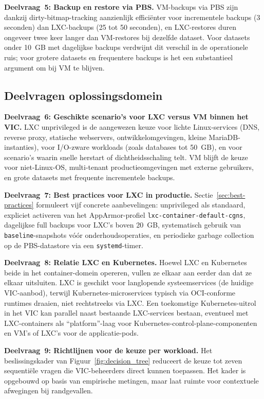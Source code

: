 \textbf{Deelvraag~5: Backup en restore via PBS.} VM-backups via PBS zijn dankzij dirty-bitmap-tracking aanzienlijk efficiënter voor incrementele backups (3 seconden) dan LXC-backups (25 tot 50 seconden), en LXC-restores duren ongeveer twee keer langer dan VM-restores bij dezelfde dataset. Voor datasets onder 10~GB met dagelijkse backups verdwijnt dit verschil in de operationele ruis; voor grotere datasets en frequentere backups is het een substantieel argument om bij VM te blijven.

\subsection*{Deelvragen oplossingsdomein}
\textbf{Deelvraag~6: Geschikte scenario's voor LXC versus VM binnen het VIC.} LXC unprivileged is de aangewezen keuze voor lichte Linux-services (DNS, reverse proxy, statische webservers, ontwikkelomgevingen, kleine MariaDB-instanties), voor I/O-zware workloads (zoals databases tot 50~GB), en voor scenario's waarin snelle herstart of dichtheidsschaling telt. VM blijft de keuze voor niet-Linux-OS, multi-tenant productieomgevingen met externe gebruikers, en grote datasets met frequente incrementele backups.

\textbf{Deelvraag~7: Best practices voor LXC in productie.} Sectie~\ref{sec:best-practices} formuleert vijf concrete aanbevelingen: unprivileged als standaard, expliciet activeren van het AppArmor-profiel \texttt{lxc-container-default-cgns}, dagelijkse full backups voor LXC's boven 20~GB, systematisch gebruik van \texttt{baseline}-snapshots vóór onderhoudsoperaties, en periodieke garbage collection op de PBS-datastore via een \texttt{systemd}-timer.

\textbf{Deelvraag~8: Relatie LXC en Kubernetes.} Hoewel LXC en Kubernetes beide in het container-domein opereren, vullen ze elkaar aan eerder dan dat ze elkaar uitsluiten. LXC is geschikt voor langlopende systeemservices (de huidige VIC-aanbod), terwijl Kubernetes-microservices typisch via OCI-conforme runtimes draaien, niet rechtstreeks via LXC. Een toekomstige Kubernetes-uitrol in het VIC kan parallel naast bestaande LXC-services bestaan, eventueel met LXC-containers als ``platform''-laag voor Kubernetes-control-plane-componenten en VM's of LXC's voor de applicatie-pods.

\textbf{Deelvraag~9: Richtlijnen voor de keuze per workload.} Het beslissingskader van Figuur~\ref{fig:decision_tree} reduceert de keuze tot zeven sequentiële vragen die VIC-beheerders direct kunnen toepassen. Het kader is opgebouwd op basis van empirische metingen, maar laat ruimte voor contextuele afwegingen bij randgevallen.

